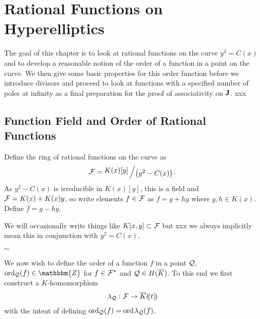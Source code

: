 \documentclass[english,11pt,a4paper]{article}
\begin{document}
\section{Rational Functions on Hyperelliptics}

The goal of this chapter is to look at rational functions on the curve $y^2 = C(x)$ and to develop a reasonable notion of the order of a function in a point on the curve. We then give some basic properties for this order function before we introduce divisors and proceed to look at functions with a specified number of poles at infinity as a final preparation for the proof of associativity on $\mathbf{J}$. xxx %

\subsection{Function Field and Order of Rational Functions}

\begin{defin}
	Define the ring of rational functions on the curve as
	\begin{align*}
	  \F = \bigslant{K(x)[y]}{\big(y^2-C(x)\big)}.
	\end{align*}
  As $y^2-C(x)$ is irreducible in $K(x)[y]$, this is a field
  and $\mathcal{F} = K(x) + K(x) y$, so write elements $f \in \mathcal{F}$ as $f = g + hy$ where $g,h \in K(x)$. Define $\bar f = g - hy$.

  We will occasionally write things like $K[x,y] \subset \mathcal{F}$ but xxx we always implicitly mean this in conjunction with $y^2=C(x)$.
\end{defin}

\begin{center}
$\sim$
\end{center}

We now wish to define the order of a function $f$ in a point $\mathcal{Q}$, $\ordq (f) \in \mathbbm{Z}$ for $f \in \mathcal{F}^*$ and $\mathcal{Q} \in H(\overline K)$. To this end we first construct a $K$-homomorphism
\begin{align*}
  \lambda_{\mathcal{Q}}: \mathcal{F} \rightarrow \overline K (\! (t)\! )
\end{align*}
with the intent of defining $\text{ord}_{\mathcal{Q}}(f) = \text{ord\hspace{0.4mm}} \lambda_{\mathcal{Q}} (f)$.
\end{document}
